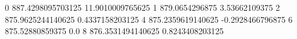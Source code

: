 0 887.4298095703125 11.9010009765625
1 879.0654296875 3.53662109375
2 875.9625244140625 0.4337158203125
4 875.2359619140625 -0.2928466796875
6 875.52880859375 0.0
8 876.3531494140625 0.8243408203125
